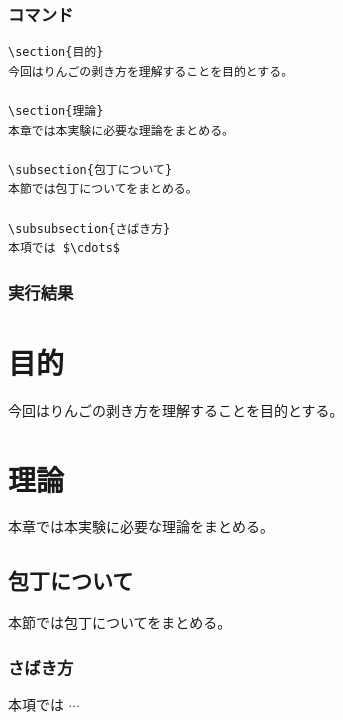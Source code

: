 \documentclass[a4j, titlepage]{jarticle}
\begin{document}
\begin{multicols}{2}

\subsubsection*{コマンド}

\begin{lstlisting}
\section{目的}
今回はりんごの剥き方を理解することを目的とする。

\section{理論}
本章では本実験に必要な理論をまとめる。

\subsection{包丁について}
本節では包丁についてをまとめる。

\subsubsection{さばき方}
本項では $\cdots$
\end{lstlisting}

\vfill\null
\columnbreak

\subsubsection*{実行結果}
\setcounter{section}{0}
\begin{screen}

    \section{目的}
    今回はりんごの剥き方を理解することを目的とする。

    \section{理論}
    本章では本実験に必要な理論をまとめる。

    \subsection{包丁について}
    本節では包丁についてをまとめる。

    \subsubsection{さばき方}
    本項では $\cdots$

\end{screen}


\end{multicols}
\setcounter{section}{1}
\end{document}
